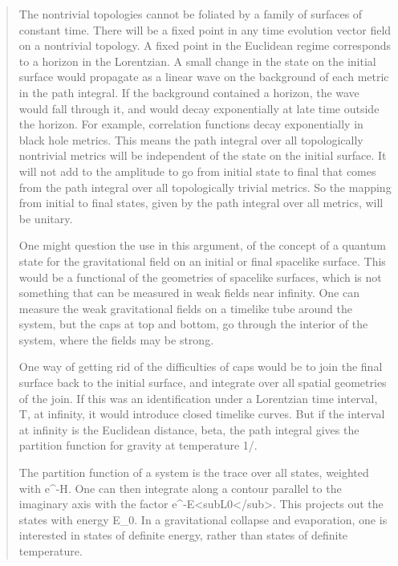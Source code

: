 \begin{quote}
     The nontrivial topologies cannot be foliated by a family of
     surfaces of constant time. There will be a fixed point in any time
     evolution vector field on a nontrivial topology.  A fixed point in 
     the Euclidean regime corresponds to a horizon in the Lorentzian. 
     A small change in the state on the initial surface would propagate as 
     a linear wave on the background of each metric in the path integral. 
     If the background contained a horizon, the wave would fall through it,
     and would decay exponentially at late time outside the horizon.  For
     example, correlation functions decay exponentially in black hole
     metrics.  This means the path integral over all topologically
     nontrivial metrics will be independent of the state on the initial
     surface.  It will not add to the amplitude to go from initial state to
     final that comes from the path integral over all topologically
     trivial metrics. So the mapping from initial to final states, given 
     by the path integral over all metrics, will be unitary.  

     One might question the use in this argument, of the concept of a 
     quantum state for the gravitational field on an initial or final 
     spacelike surface.  This would be a functional of the geometries of 
     spacelike surfaces, which is not something that can be measured in 
     weak fields near infinity.  One can measure the weak gravitational 
     fields on a timelike tube around the system, but the caps at top and 
     bottom, go through the interior of the system, where the fields may 
     be strong.

     One way of getting rid of the difficulties of caps would be to join
     the final surface back to the initial surface, and integrate over all
     spatial geometries of the join.  If this was an identification under a
     Lorentzian time interval, T, at infinity, it would introduce closed
     timelike curves. But if the interval at infinity is the Euclidean
     distance, beta, the path integral gives the partition function for
     gravity at temperature 1/\beta .

     The partition function of a system is the trace over all states,
     weighted with e^{-\beta  H}.  One can then integrate \beta  along
     a contour parallel to the imaginary axis with the factor e^{-\beta  E<subL0</sub>}.
     This projects out the states with energy E_{0}. In a gravitational 
     collapse and evaporation, one is interested in states of
     definite energy, rather than states of definite temperature.


\end{quote}
